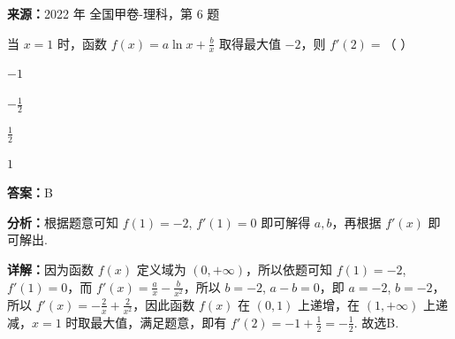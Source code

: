 \begin{question}[points=5]
\textbf{来源：}2022 年 全国甲卷-理科，第 6 题\par
当 $x=1$ 时，函数 $f(x)=a\ln x + \frac{b}{x}$ 取得最大值 $-2$，则 $f'(2)=$（ ）
\begin{choices}
  \item $-1$
  \item $-\frac{1}{2}$
  \item $\frac{1}{2}$
  \item $1$
\end{choices}
\begin{solution}
\textbf{答案：}B

\textbf{分析：}根据题意可知 $f(1)=-2$, $f'(1)=0$ 即可解得 $a,b$，再根据 $f'(x)$ 即可解出.

\textbf{详解：}因为函数 $f(x)$ 定义域为 $(0,+\infty)$，所以依题可知 $f(1)=-2$, $f'(1)=0$，而 $f'(x)=\frac{a}{x}-\frac{b}{x^2}$，所以 $b=-2$, $a-b=0$，即 $a=-2$, $b=-2$，所以 $f'(x)=-\frac{2}{x}+\frac{2}{x^2}$，因此函数 $f(x)$ 在 $(0,1)$ 上递增，在 $(1,+\infty)$ 上递减，$x=1$ 时取最大值，满足题意，即有 $f'(2)=-1+\frac{1}{2}=-\frac{1}{2}$. 故选B.
\end{solution}
\end{question}

